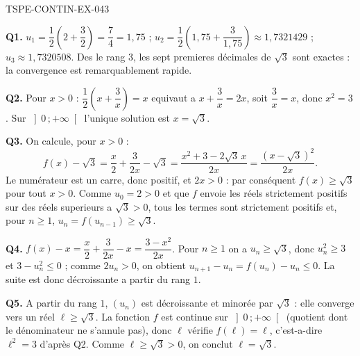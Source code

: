 \begin{corrige}{TSPE-CONTIN-EX-043}

\textbf{Q1.} $u_1 = \dfrac{1}{2}\left(2 + \dfrac32\right) = \dfrac{7}{4} = 1{,}75$ ; $u_2 = \dfrac{1}{2}\left(1{,}75 + \dfrac{3}{1{,}75}\right) \approx 1{,}7321429$ ; $u_3 \approx 1{,}7320508$. Des le rang $3$, les sept premieres décimales de $\sqrt3$ sont exactes : la convergence est remarquablement rapide.

\textbf{Q2.} Pour $x > 0$ : $\dfrac{1}{2}\left(x + \dfrac3x\right) = x$ equivaut a $x + \dfrac3x = 2x$, soit $\dfrac3x = x$, donc $x^2 = 3$. Sur $\left]0\,;+\infty\right[$ l'unique solution est $x = \sqrt3$.

\textbf{Q3.} On calcule, pour $x > 0$ :
\[ f(x) - \sqrt3 = \frac{x}{2} + \frac{3}{2x} - \sqrt3 = \frac{x^2 + 3 - 2\sqrt3\,x}{2x} = \frac{\left(x - \sqrt3\right)^2}{2x}. \]
Le numérateur est un carre, donc positif, et $2x > 0$ : par conséquent $f(x) \geq \sqrt3$ pour tout $x > 0$. Comme $u_0 = 2 > 0$ et que $f$ envoie les réels strictement positifs sur des réels superieurs a $\sqrt3 > 0$, tous les termes sont strictement positifs et, pour $n \geq 1$, $u_n = f(u_{n-1}) \geq \sqrt3$.

\textbf{Q4.} $f(x) - x = \dfrac{x}{2} + \dfrac{3}{2x} - x = \dfrac{3 - x^2}{2x}$. Pour $n \geq 1$ on a $u_n \geq \sqrt3$, donc $u_n^2 \geq 3$ et $3 - u_n^2 \leq 0$ ; comme $2u_n > 0$, on obtient $u_{n+1} - u_n = f(u_n) - u_n \leq 0$. La suite est donc décroissante a partir du rang $1$.

\textbf{Q5.} A partir du rang $1$, $(u_n)$ est décroissante et minorée par $\sqrt3$ : elle converge vers un réel $\ell \geq \sqrt3$. La fonction $f$ est continue sur $\left]0\,;+\infty\right[$ (quotient dont le dénominateur ne s'annule pas), donc $\ell$ vérifie $f(\ell) = \ell$, c'est-a-dire $\ell^2 = 3$ d'après Q2. Comme $\ell \geq \sqrt3 > 0$, on conclut $\ell = \sqrt3$.
\end{corrige}
